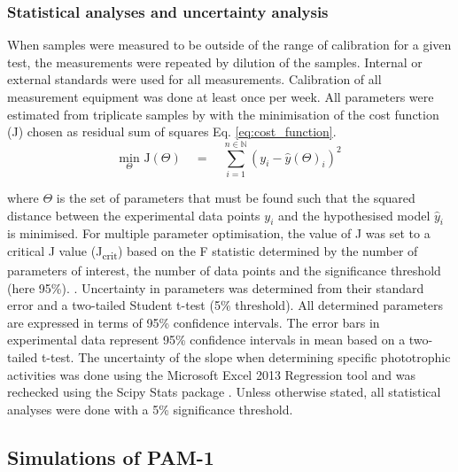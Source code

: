 \subsubsection{Statistical analyses and uncertainty analysis}
When samples were measured to be outside of the range of calibration for a given test, the measurements were repeated by dilution of the samples. Internal or external standards were used for all measurements. Calibration of all measurement equipment was done at least once per week. All parameters were estimated from triplicate samples by with the minimisation of the cost function (J) chosen as residual sum of squares Eq. \eqref{eq:cost_function}.
\begin{equation}
    \label{eq:cost_function}
    \underset{\Theta}{\mathrm{min}}\, \, \mathrm{J}(\Theta)\quad  = \quad \sum_{i = 1}^{n\in\mathbb{N}} \left(y_i - \hat{y}(\Theta)_i    \right)^2
\end{equation}

\noindent where $\Theta$ is the set of parameters that must be found such that the squared distance between the experimental data points $y_i$ and the hypothesised model $\hat{y}_i$ is minimised. For multiple parameter optimisation, the value of J was set to a critical J value (J\textsubscript{crit}) based on the F statistic determined by the number of parameters of interest, the number of data points and the significance threshold (here 95\%). \cite{Batstone2003}. Uncertainty in parameters was determined from their standard error and a two-tailed Student t-test (5\% threshold). All determined parameters are expressed in terms of 95\% confidence intervals. The error bars in experimental data represent 95\% confidence intervals in mean based on a two-tailed t-test. The uncertainty of the slope when determining specific phototrophic activities was done using the Microsoft Excel 2013 Regression tool and was rechecked using the Scipy Stats package \cite{Scipy2001}. Unless otherwise stated, all statistical analyses were done with a 5\% significance threshold.

\subsection{Simulations of PAM-1}

